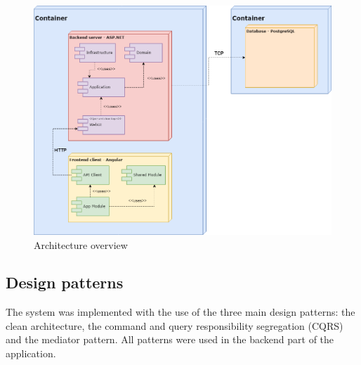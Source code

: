 \documentclass[a4paper,twoside,12pt]{book}
\begin{document}
\begin{figure}
\centering
\includegraphics[width=\textwidth]{images/Architecture.drawio.png}
\caption{Architecture overview}
\label{fig:architectureOverview}
\end{figure}

\subsection{Design patterns}
The system was implemented with the use of the three main design patterns: the clean architecture, the command and query responsibility segregation (CQRS) and the mediator pattern. All patterns were used in the backend part of the application.
\end{document}
